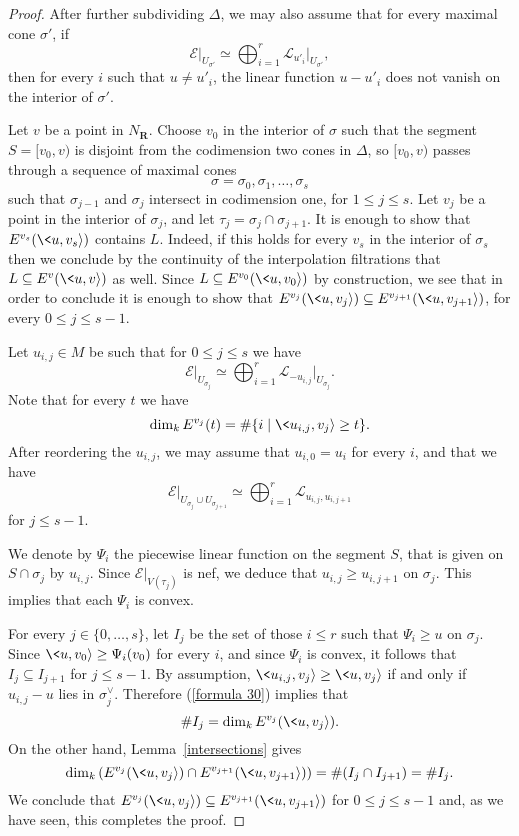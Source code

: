 \documentclass[12pt]{amsart}
\theoremstyle{definition}
\theoremstyle{remark}
\begin{document}
\begin{proof}
 After further subdividing
 $\Delta$,
 we may also assume that for every maximal cone $\sigma'$,
if
$${\mathcal{E}}\vert_{U_{\sigma'}}\simeq\bigoplus_{i=1}^r{\mathcal{L}}_{u'_i}\vert_{U_{\sigma'}},$$
then for every $i$ such that $u\neq u'_i$, the linear function
$u-u'_i$ does not vanish on the interior of $\sigma'$.

Let $v$ be a point in $N_{{\mathbf R}}$.  Choose $v_0$ in the interior of
$\sigma$ such that the segment $S=[v_0,v)$ is disjoint from the
codimension two cones in $\Delta$, so $[v_0, v)$ passes through a
sequence of maximal cones
\[
\sigma = \sigma_0, \sigma_1, \ldots, \sigma_s
\]
such that $\sigma_{j-1}$ and $\sigma_{j}$ intersect in codimension
one, for $1 \leq j \leq s$.
 Let $v_j$ be a point in the interior of $\sigma_j$, and let $\tau_j = \sigma_j\cap\sigma_{j+1}$.
It is enough to show that $E^{v_s}(\<u,v_s{\rangle})$ contains $L$. Indeed,
if this holds for every $v_s$ in the interior of $\sigma_s$ then we
conclude by the continuity of the interpolation filtrations that
$L\subseteq E^v(\<u,v{\rangle})$ as well. Since $L\subseteq
E^{v_0}(\<u,v_0{\rangle})$ by construction, we see that in order to
conclude it is enough to show that $E^{v_j}(\<u,v_j{\rangle})\subseteq
E^{v_{j+1}}(\<u,v_{j+1}{\rangle})$, for every $0\leq j\leq s-1$.

Let $u_{i,j}\in M$ be such that for $0\leq j\leq s$ we have
$${\mathcal{E}}\vert_{U_{\sigma_j}}\simeq\bigoplus_{i=1}^r{\mathcal{L}}_{-u_{i,j}}\vert_{U_{\sigma_j}}.$$
Note that for every $t$ we have
\begin{equation}\label{formula 30}
\dim_k E^{v_j}(t)=\#\{i\mid\<u_{i,j},v_j{\rangle}\geq t\}.
\end{equation}
After reordering the $u_{i,j}$, we may assume that $u_{i,0}=u_i$ for
every $i$, and that we have
$${\mathcal{E}}\vert_{U_{\sigma_j}\cup
U_{\sigma_{j+1}}}\simeq\bigoplus_{i=1}^r{\mathcal{L}}_{u_{i,j},u_{i,j+1}}$$
for $j\leq s-1$.

We denote by $\Psi_i$ the piecewise linear function on the segment
$S$, that is given on $S\cap\sigma_j$ by $u_{i,j}$. Since
${\mathcal{E}}\vert_{V(\tau_j)}$ is nef, we deduce that $u_{i,j}\geq
u_{i,j+1}$ on $\sigma_j$. This implies that each $\Psi_i$ is convex.

For every $j\in\{0,\ldots,s\}$, let $I_j$ be the set of those $i\leq
r$ such that $\Psi_i\geq u$ on $\sigma_j$. Since
$\<u,v_0{\rangle}\geq\Psi_i(v_0)$ for every $i$, and since $\Psi_i$ is
convex, it follows that $I_j\subseteq I_{j+1}$ for $j\leq s-1$. By
assumption, $\<u_{i,j},v_j{\rangle}\geq \<u,v_j{\rangle}$ if and only if
$u_{i,j}-u$ lies in $\sigma_j^{\vee}$. Therefore (\ref{formula 30})
implies that
$$\# I_j=\dim_kE^{v_j}(\<u,v_j{\rangle}).$$
On the other hand, Lemma~\ref{intersections} gives
$$\dim_k\left(E^{v_j}(\<u,v_j{\rangle})\cap E^{v_{j+1}}(\<u,v_{j+1}{\rangle})\right)=\#(I_j\cap I_{j+1})=\# I_j.$$
We conclude that $E^{v_j}(\<u,v_j{\rangle})\subseteq
E^{v_{j+1}}(\<u,v_{j+1}{\rangle})$ for $0\leq j\leq s-1$ and, as we have
seen, this completes the proof.
\end{proof}
\end{document}
